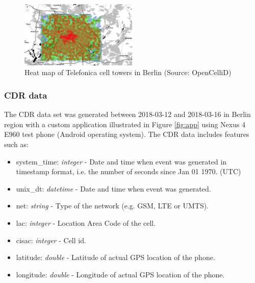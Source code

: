 \begin{figure}[h]
    \includegraphics[width=0.5\textwidth]{images/opencellid.png}
    \caption{Heat map of Telefonica cell towers in Berlin (Source: OpenCelliD) }
    \label{fig:opencellid}
\end{figure}

\subsubsection{CDR data}
The CDR data set was generated between 2018-03-12 and 2018-03-16 in Berlin region with a custom application illustrated in Figure \ref{fig:app} using Nexus 4 E960 test phone (Android operating system). The CDR data includes features such as:
\begin{itemize}
\item system\_time: \textit{integer} - Date and time when event was generated in timestamp format, i.e. the number of seconds since Jan 01 1970. (UTC)
\item unix\_dt: \textit{datetime} - Date and time when event was generated.
\item net: \textit{string} - Type of the network (e.g. GSM, LTE or UMTS).
\item lac: \textit{integer} - Location Area Code of the cell.
\item cisac: \textit{integer} - Cell id.
\item latitude: \textit{double} - Latitude of actual GPS location of the phone.
\item longitude: \textit{double} - Longitude of actual GPS location of the phone.
\end{itemize}

